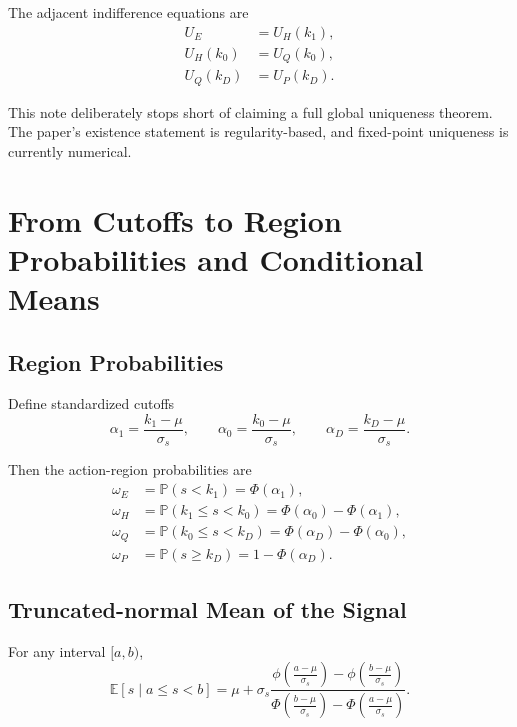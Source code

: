\documentclass[11pt,a4paper]{article}
\theoremstyle{definition}
\theoremstyle{plain}
\theoremstyle{remark}
\newcommand{\E}{\mathbb{E}}
\newcommand{\PP}{\mathbb{P}}
\newcommand{\1}{\mathbf{1}}
\begin{document}
The adjacent indifference equations are
\begin{align}
U_E &= U_H(k_1), \label{eq:k1-indiff} \\
U_H(k_0) &= U_Q(k_0), \label{eq:k0-indiff} \\
U_Q(k_D) &= U_P(k_D). \label{eq:kD-indiff}
\end{align}

\begin{warningbox}
This note deliberately stops short of claiming a full global uniqueness theorem. The paper's existence statement is regularity-based, and fixed-point uniqueness is currently numerical.
\end{warningbox}

\section{From Cutoffs to Region Probabilities and Conditional Means}

\subsection{Region Probabilities}

Define standardized cutoffs
\begin{equation}
\alpha_1=\frac{k_1-\mu}{\sigma_s},
\qquad
\alpha_0=\frac{k_0-\mu}{\sigma_s},
\qquad
\alpha_D=\frac{k_D-\mu}{\sigma_s}.
\label{eq:alphas}
\end{equation}

Then the action-region probabilities are
\begin{align}
\omega_E &= \PP(s<k_1)=\Phi(\alpha_1), \label{eq:omegaE} \\
\omega_H &= \PP(k_1\le s<k_0)=\Phi(\alpha_0)-\Phi(\alpha_1), \label{eq:omegaH} \\
\omega_Q &= \PP(k_0\le s<k_D)=\Phi(\alpha_D)-\Phi(\alpha_0), \label{eq:omegaQ} \\
\omega_P &= \PP(s\ge k_D)=1-\Phi(\alpha_D). \label{eq:omegaP}
\end{align}

\subsection{Truncated-normal Mean of the Signal}

For any interval $[a,b)$,
\begin{equation}
\E[s\mid a\le s<b]
=
\mu + \sigma_s \frac{\phi\!\left(\frac{a-\mu}{\sigma_s}\right)-\phi\!\left(\frac{b-\mu}{\sigma_s}\right)}
{\Phi\!\left(\frac{b-\mu}{\sigma_s}\right)-\Phi\!\left(\frac{a-\mu}{\sigma_s}\right)}.
\label{eq:truncated-s}
\end{equation}
\end{document}
